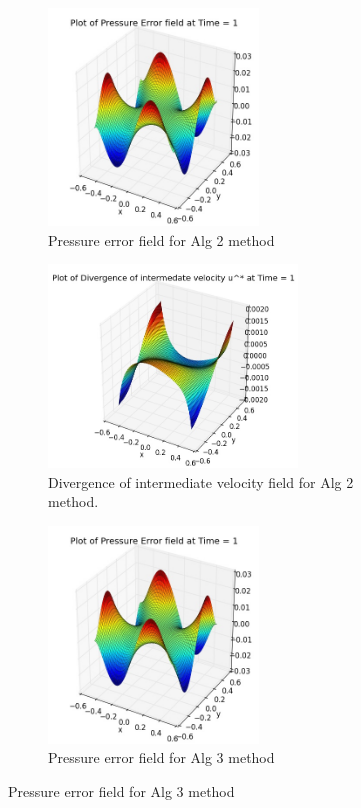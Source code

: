 \begin{figure}[H]
	\centering
	\begin{subfigure}[t]{2.2in}
		\centering
		\includegraphics[width=2.2in]{figures/Pm1b_pf2b_P_error_t_1_grid_60.jpg}
		\caption{Pressure error field for Alg 2 method}\label{fig:6.11a}		
	\end{subfigure}
	\quad
	\begin{subfigure}[t]{2.6in}
		\centering
		\includegraphics[width=2.6in]{figures/Pm1b_pf2b_div_uvstar_t_1_grid_60.jpg}
		\caption{Divergence of intermediate velocity field for Alg 2 method. }\label{fig:6.11b}
	\end{subfigure}
	\quad
	\centering
	\begin{subfigure}[t]{2.2in}
		\centering
		\includegraphics[width=2.2in]{figures/Pm2_pf2b_np_P_error_t_1_grid_60.jpg}
		\caption{Pressure error field for Alg 3 method}\label{fig:6.11c}		
	\end{subfigure}

\end{figure}
